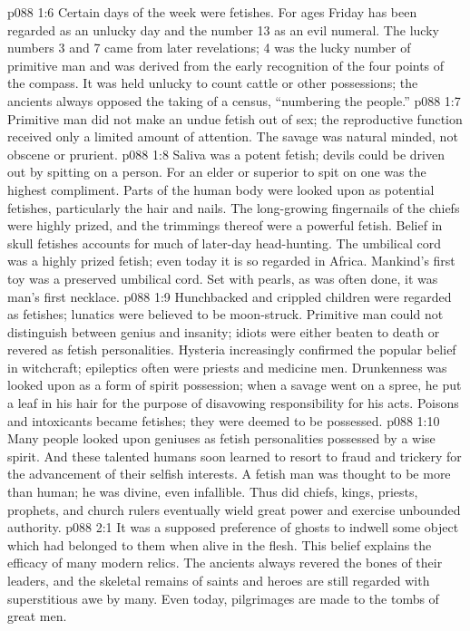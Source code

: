 \vs p088 1:6 Certain days of the week were fetishes. For ages Friday has been regarded as an unlucky day and the number 13 as an evil numeral. The lucky numbers 3 and 7 came from later revelations; 4 was the lucky number of primitive man and was derived from the early recognition of the four points of the compass. It was held unlucky to count cattle or other possessions; the ancients always opposed the taking of a census, “numbering the people.”
\vs p088 1:7 Primitive man did not make an undue fetish out of sex; the reproductive function received only a limited amount of attention. The savage was natural minded, not obscene or prurient.
\vs p088 1:8 Saliva was a potent fetish; devils could be driven out by spitting on a person. For an elder or superior to spit on one was the highest compliment. Parts of the human body were looked upon as potential fetishes, particularly the hair and nails. The long\hyp{}growing fingernails of the chiefs were highly prized, and the trimmings thereof were a powerful fetish. Belief in skull fetishes accounts for much of later\hyp{}day head\hyp{}hunting. The umbilical cord was a highly prized fetish; even today it is so regarded in Africa. Mankind’s first toy was a preserved umbilical cord. Set with pearls, as was often done, it was man’s first necklace.
\vs p088 1:9 Hunchbacked and crippled children were regarded as fetishes; lunatics were believed to be moon\hyp{}struck. Primitive man could not distinguish between genius and insanity; idiots were either beaten to death or revered as fetish personalities. Hysteria increasingly confirmed the popular belief in witchcraft; epileptics often were priests and medicine men. Drunkenness was looked upon as a form of spirit possession; when a savage went on a spree, he put a leaf in his hair for the purpose of disavowing responsibility for his acts. Poisons and intoxicants became fetishes; they were deemed to be possessed.
\vs p088 1:10 Many people looked upon geniuses as fetish personalities possessed by a wise spirit. And these talented humans soon learned to resort to fraud and trickery for the advancement of their selfish interests. A fetish man was thought to be more than human; he was divine, even infallible. Thus did chiefs, kings, priests, prophets, and church rulers eventually wield great power and exercise unbounded authority.
\vs p088 2:1 It was a supposed preference of ghosts to indwell some object which had belonged to them when alive in the flesh. This belief explains the efficacy of many modern relics. The ancients always revered the bones of their leaders, and the skeletal remains of saints and heroes are still regarded with superstitious awe by many. Even today, pilgrimages are made to the tombs of great men.
